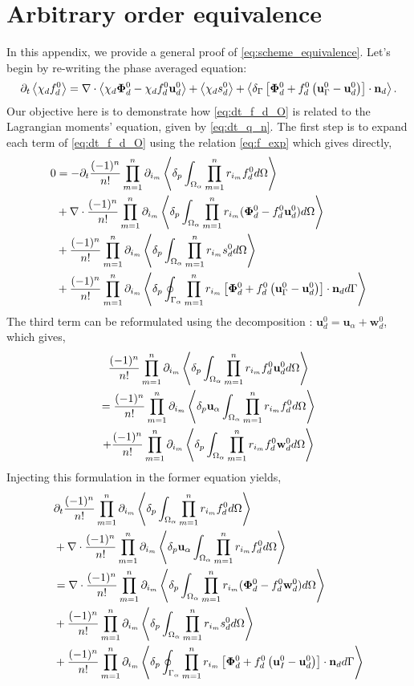 \section{Arbitrary order equivalence}
\label{ap:equivalence}
In this appendix, we provide a general proof of \ref{eq:scheme_equivalence}. 
Let's begin by re-writing the phase averaged equation:
\begin{equation}
        \pddt \avg{\chi_d f_d^0}
        = \div \avg{\chi_d \bm\Phi_d^0 - \chi_d f_d^0 \textbf{u}_d^0}
        + \avg{\chi_d s_d^0}
        + \avg{\delta_\Gamma\left[
            \bm\Phi_d^0
            + f_d^0
            \left(
                \textbf{u}_\Gamma^0
                - \textbf{u}_d^0
            \right)
        \right]
        \cdot \textbf{n}_d}.
        \label{eq:dt_f_d_O}
\end{equation}
Our objective here is to demonstrate how \ref{eq:dt_f_d_O} is related to the Lagrangian moments' equation, given by \ref{eq:dt_q_n}. 
The first step is to expand each term of \ref{eq:dt_f_d_O} using the relation \ref{eq:f_exp} which gives directly,
\begin{align*}
        0 &=
        - \partial_t \frac{(-1)^n}{n!} \prod_{m=1}^{n} \partial_{i_m} \left<\delta_p \int_{\Omega_{\alpha}}  \prod_{m=1}^{n} r_{i_m}f_d^0  d\Omega\right> \\
        &+\mathbf{\nabla}\cdot \frac{(-1)^n}{n!} \prod_{m=1}^{n} \partial_{i_m} \left<\delta_p \int_{\Omega_{\alpha}}  \prod_{m=1}^{n} r_{i_m}(\bm\Phi_d^0  - f_d^0 \textbf{u}_d^0)  d\Omega\right>\\
        &+ \frac{(-1)^n}{n!} \prod_{m=1}^{n} \partial_{i_m} \left<\delta_p \int_{\Omega_{\alpha}}  \prod_{m=1}^{n} r_{i_m} s_d^0  d\Omega\right>\\
        &+ \frac{(-1)^n}{n!} \prod_{m=1}^{n} \partial_{i_m} \left<\delta_p \oint_{\Gamma_{\alpha}} \prod_{m=1}^{n} r_{i_m}\left[
            \bm\Phi_d^0
            + f_d^0
            \left(
                \textbf{u}_\Gamma^0
                - \textbf{u}_d^0
            \right)
        \right]
        \cdot \textbf{n}_d  d\Gamma\right> \\
\end{align*}
The third term can be reformulated using the decomposition : $\textbf{u}_d^0 = \textbf{u}_\alpha + \textbf{w}_d^0$, which gives,
\begin{multline}
    \frac{(-1)^n}{n!} \prod_{m=1}^{n} \partial_{i_m} \left<\delta_p \int_{\Omega_{\alpha}}  \prod_{m=1}^{n} r_{i_m}f_d^0 \textbf{u}_d^0  d\Omega\right>\\
    =     \frac{(-1)^n}{n!} \prod_{m=1}^{n} \partial_{i_m} \left<\delta_p \textbf{u}_\alpha\int_{\Omega_{\alpha}}  \prod_{m=1}^{n} r_{i_m}f_d^0   d\Omega\right>\\
    +     \frac{(-1)^n}{n!} \prod_{m=1}^{n} \partial_{i_m} \left<\delta_p \int_{\Omega_{\alpha}}  \prod_{m=1}^{n} r_{i_m}f_d^0 \textbf{w}_d^0  d\Omega\right>
\end{multline}
Injecting this formulation in the former equation yields,
\begin{align}
    & \pddt \expo{f_d^0} \\
    &+ \div \expoU{f_d^0}\\
    &= \div \expo{(\bm\Phi_d^0 - f_d^0 \textbf{w}_d^0)}\\
    &+ \expo{ s_d^0}\\
    &+ \expoS{\left[
        \bm\Phi_d^0
        + f_d^0 
        \left(
            \textbf{u}_I^0
            - \textbf{u}_d^0
        \right)
    \right]
    \cdot \textbf{n}_d} \\
    \label{eq:nearly_done}
\end{align}
